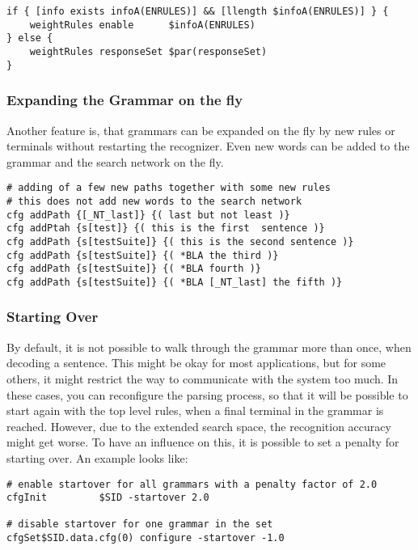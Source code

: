 \begin{verbatim}
if { [info exists infoA(ENRULES)] && [llength $infoA(ENRULES)] } {
    weightRules enable      $infoA(ENRULES)
} else {
    weightRules responseSet $par(responseSet)
}
\end{verbatim}

\subsubsection{Expanding the Grammar on the fly}

Another feature is, that grammars can be expanded on the fly by new
rules or terminals without restarting the recognizer. Even new words
can be added to the grammar and the search network on the fly.

\begin{verbatim}
# adding of a few new paths together with some new rules
# this does not add new words to the search network
cfg addPath {[_NT_last]} {( last but not least )}
cfg addPtah {s[test]} {( this is the first  sentence )}
cfg addPath {s[testSuite]} {( this is the second sentence )}
cfg addPath {s[testSuite]} {( *BLA the third )}
cfg addPath {s[testSuite]} {( *BLA fourth )}
cfg addPath {s[testSuite]} {( *BLA [_NT_last] the fifth )}
\end{verbatim}


\subsubsection{Starting Over}

By default, it is not possible to walk through the grammar more than
once, when decoding a sentence.  This might be okay for most
applications, but for some others, it might restrict the way to
communicate with the system too much.  In these cases, you can
reconfigure the parsing process, so that it will be possible to start
again with the top level rules, when a final terminal in the grammar
is reached. However, due to the extended search space, the recognition
accuracy might get worse. To have an influence on this, it is possible
to set a penalty for starting over. An example looks like:

\begin{verbatim}
# enable startover for all grammars with a penalty factor of 2.0
cfgInit         $SID -startover 2.0

# disable startover for one grammar in the set
cfgSet$SID.data.cfg(0) configure -startover -1.0
\end{verbatim}


